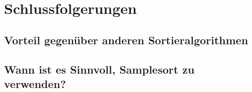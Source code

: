 \section{Schlussfolgerungen}

\subsection{Vorteil gegenüber anderen Sortieralgorithmen}

\subsection{Wann ist es Sinnvoll, Samplesort zu verwenden?}
